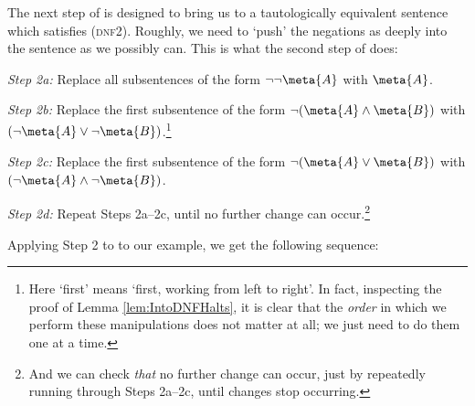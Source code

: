 The next step of \intoDNF{} is designed to bring us to a tautologically equivalent sentence which satisfies (\textsc{dnf2}). Roughly, we need to `push' the negations as deeply into the sentence as we possibly can. This is what the second step of \intoDNF{} does:
	\begin{ebullet}
		\item[\emph{Step 2a:}] Replace all subsentences of the form $\lnot\lnot\meta{A}$ with $\meta{A}$.
		\item[\emph{Step 2b:}] Replace the first subsentence of the form  $\lnot (\meta{A} \land \meta{B})$ with $(\lnot \meta{A} \lor \lnot \meta{B})$.\footnote{Here `first' means `first, working from left to right'. In fact, inspecting the proof of Lemma \ref{lem:IntoDNFHalts}, it is clear that the \emph{order} in which we perform these manipulations does not matter at all; we just need to do them one at a time.}
		\item[\emph{Step 2c:}] Replace the first subsentence of the form  $\lnot (\meta{A} \lor \meta{B})$ with $(\lnot \meta{A} \land \lnot \meta{B})$. 
		\item[\emph{Step 2d:}] Repeat Steps 2a--2c, until no further change can occur.\footnote{And we can check \emph{that} no further change can occur, just by repeatedly running through Steps 2a--2c, until changes stop occurring.}
	\end{ebullet}
Applying Step 2 to to our example, we get the following sequence:
